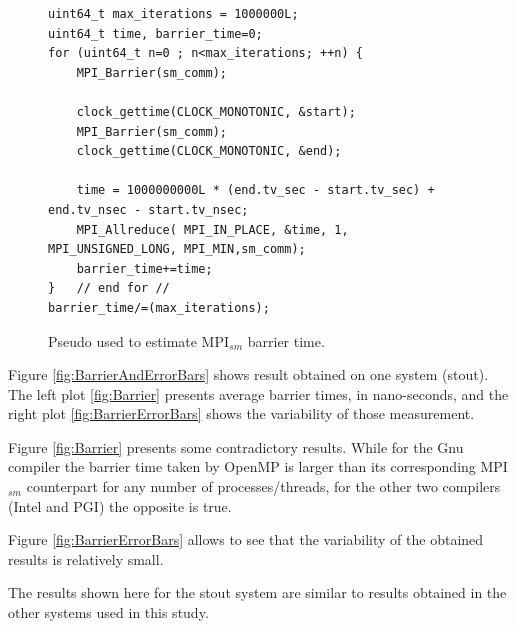 \begin{figure} [t!]
\centering
\captionsetup{justification=centering, singlelinecheck=false}
\begin{lstlisting}[style=CStyle]
uint64_t max_iterations = 1000000L;
uint64_t time, barrier_time=0;
for (uint64_t n=0 ; n<max_iterations; ++n) {
    MPI_Barrier(sm_comm);
        
    clock_gettime(CLOCK_MONOTONIC, &start);
    MPI_Barrier(sm_comm);    
    clock_gettime(CLOCK_MONOTONIC, &end);
    
    time = 1000000000L * (end.tv_sec - start.tv_sec) + end.tv_nsec - start.tv_nsec;
    MPI_Allreduce( MPI_IN_PLACE, &time, 1, MPI_UNSIGNED_LONG, MPI_MIN,sm_comm);
    barrier_time+=time;
}	// end for //
barrier_time/=(max_iterations);
\end{lstlisting}    
\caption{Pseudo used to estimate MPI$_{sm}$ barrier time.}
\label{fig:PseudoCode3}
\end{figure}


\medskip

Figure \ref{fig:BarrierAndErrorBars} shows result obtained on one system (stout). The left plot \ref{fig:Barrier} presents average barrier times, in nano-seconds, and the right plot \ref{fig:BarrierErrorBars} shows the variability of those measurement.

\medskip

Figure \ref{fig:Barrier} presents some contradictory results. While for the Gnu compiler the barrier time taken by OpenMP is larger than its corresponding MPI$_{sm}$ counterpart for any number of processes/threads, for the other two compilers (Intel and PGI) the opposite is true. 

\medskip

Figure \ref{fig:BarrierErrorBars} allows to see that the variability of the obtained results is relatively small.

\medskip

The results shown here for the stout system are similar to results obtained in the other systems used in this study.


